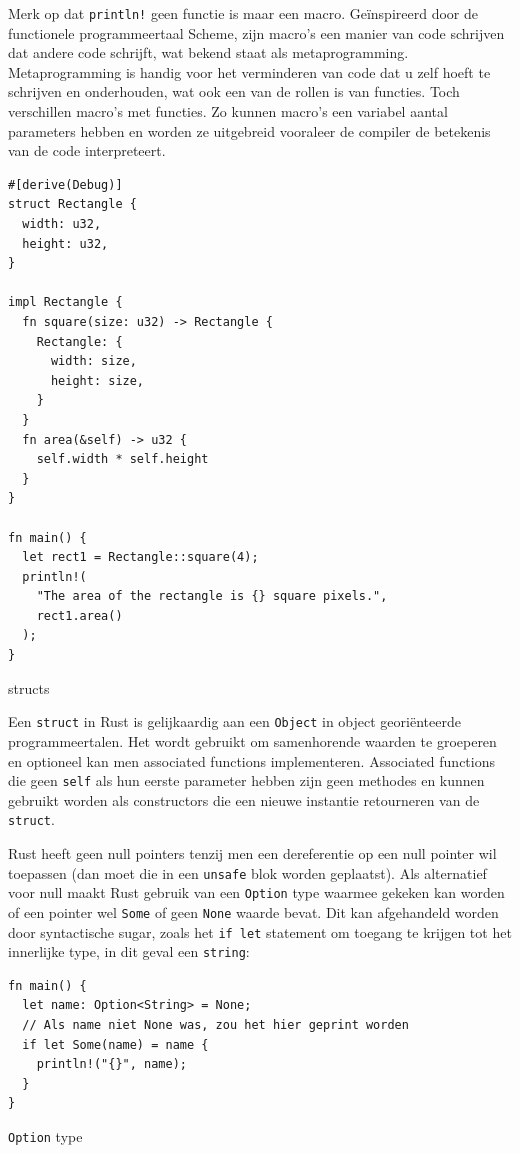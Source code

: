 \clearpage

Merk op dat \texttt{println!} geen functie is maar een macro. Geïnspireerd door de
functionele programmeertaal Scheme, zijn macro’s een manier van code schrijven dat andere code
schrijft, wat bekend staat als metaprogramming. Metaprogramming is handig voor het verminderen van
code dat u zelf hoeft te schrijven en onderhouden, wat ook een van de rollen is van functies. Toch
verschillen macro’s met functies. Zo kunnen macro’s een variabel aantal parameters hebben en worden
ze uitgebreid vooraleer de compiler de betekenis van de code interpreteert.

\begin{listing}[h]
\begin{verbatim}
#[derive(Debug)]
struct Rectangle {
  width: u32,
  height: u32,
}

impl Rectangle {
  fn square(size: u32) -> Rectangle {
    Rectangle: {
      width: size,
      height: size,
    }
  }
  fn area(&self) -> u32 {
    self.width * self.height
  }
}

fn main() {
  let rect1 = Rectangle::square(4);
  println!(
    "The area of the rectangle is {} square pixels.",
    rect1.area()
  );
}

\end{verbatim}
\caption{structs}
\end{listing}

Een \texttt{struct} in Rust is gelijkaardig aan een \texttt{Object} in object
georiënteerde programmeertalen. Het wordt gebruikt om samenhorende waarden te groeperen en optioneel
kan men associated functions implementeren. Associated functions die geen \texttt{self}
als hun eerste parameter hebben zijn geen methodes en kunnen gebruikt worden als constructors die
een nieuwe instantie retourneren van de \texttt{struct}.

\clearpage

Rust heeft geen null pointers tenzij men een dereferentie op een null pointer wil toepassen (dan
moet die in een \texttt{unsafe} blok worden geplaatst). Als alternatief voor null maakt
Rust gebruik van een \texttt{Option} type waarmee gekeken kan worden of een pointer wel
\texttt{Some} of geen \texttt{None} waarde bevat. Dit kan afgehandeld worden
door syntactische sugar, zoals het \texttt{if let} statement om toegang te krijgen tot het
innerlijke type, in dit geval een \texttt{string}:

\begin{listing}[h]
\begin{verbatim}
fn main() {
  let name: Option<String> = None;
  // Als name niet None was, zou het hier geprint worden
  if let Some(name) = name {
    println!("{}", name);
  }
}
\end{verbatim}
\caption{\texttt{Option} type}
\end{listing}

